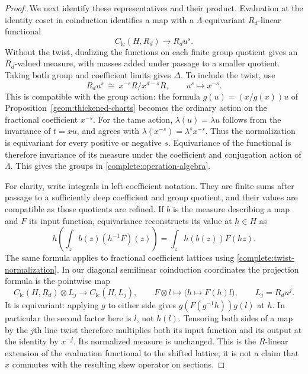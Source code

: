 \begin{proof}
We next identify these representatives and their product. Evaluation
at the identity coset in coinduction identifies a map with a
$\Lambda$-equivariant $R_d$-linear functional
\[
 C_{\mathrm{lc}}(H,R_d)\longrightarrow R_du^s.
\]
Without the twist, dualizing the functions on each finite group
quotient gives an $R_d$-valued measure, with masses added under
passage to a smaller quotient. Taking both group and coefficient
limits gives $\Delta$. To include the twist, use
\begin{equation}
\label{complete:twist-normalization}
 R_du^s\ \cong\ x^{-s}R/x^{d-s}R,
 \qquad u^s\longmapsto x^{-s}.
\end{equation}
This is compatible with the group action: the formula
$g(u)=(x/g(x))u$ of Proposition~\ref{geom:thickened-charts}
becomes the ordinary action on the fractional coefficient
$x^{-s}$. For the tame action, $\lambda(u)=\lambda u$ follows from
the invariance of $t=xu$, and agrees with
$\lambda(x^{-s})=\lambda^s x^{-s}$. Thus the normalization is
equivariant for every positive or negative $s$. Equivariance of the
functional is therefore invariance of its measure under the coefficient
and conjugation action of $\Lambda$. This gives the groups in
\eqref{complete:operation-algebra}.

For clarity, write integrals in left-coefficient notation. They are
finite sums after passage to a sufficiently deep coefficient and
group quotient, and their values are compatible as those quotients
are refined. If $b$ is the measure describing a map and $F$ its
input function, equivariance reconstructs its value at $h\in H$ as
\begin{equation}
\label{complete:coinduced-operator}
 h\left(\int_z b(z)(h^{-1}F)(z)\right)
       =\int_z h(b(z))F(hz).
\end{equation}
The same formula applies to fractional coefficient lattices using
\eqref{complete:twist-normalization}. In our diagonal semilinear
coinduction coordinates the projection formula is the pointwise map
\[
 C_{\mathrm{lc}}(H,R_d)\otimes L_j
 \longrightarrow C_{\mathrm{lc}}(H,L_j),\qquad
 F\otimes l\longmapsto\bigl(h\longmapsto F(h)l\bigr),
 \qquad L_j=R_du^j.
\]
It is equivariant: applying $g$ to either side gives
$g(F(g^{-1}h))g(l)$ at $h$. In particular the second factor here
is $l$, not $h(l)$. Tensoring both sides of a map by the $j$th line
twist therefore multiplies both its input
function and its output at the identity by $x^{-j}$. Its normalized
measure is unchanged. This is the $R$-linear extension of the
evaluation functional to the shifted lattice; it is not a claim
that $x$ commutes with the resulting skew operator on sections.


\end{proof}
